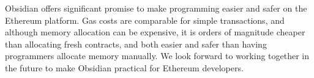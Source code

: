 Obsidian offers significant promise to make programming easier and safer on the Ethereum platform. Gas costs are comparable for simple transactions, and although memory allocation can be expensive, it is orders of magnitude cheaper than allocating fresh contracts, and both easier and safer than having programmers allocate memory manually. We look forward to working together in the future to make Obsidian practical for Ethereum developers.
